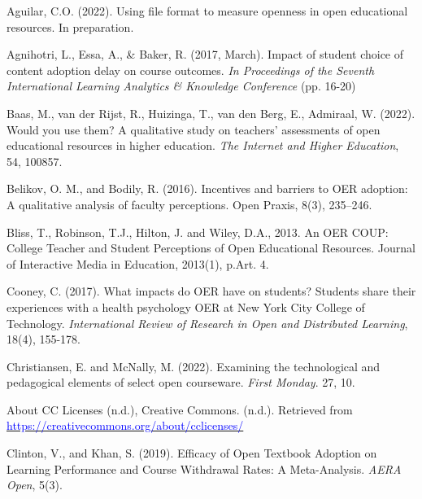 \documentclass[11pt]{article}
\newcommand{\alink}[2]{\href{#1}{\textcolor{blue}{#2}}}
\begin{document}
\begin{thebibliography}{99}

   Aguilar, C.O. (2022). Using file format to measure openness in open educational resources. In preparation.

   Agnihotri, L., Essa, A., \& Baker, R. (2017, March). Impact of student choice of content adoption delay on course outcomes. {\em In Proceedings of the Seventh International Learning Analytics \& Knowledge Conference} (pp. 16-20)

   Baas, M., van der Rijst, R., Huizinga, T., van den Berg, E., Admiraal, W. (2022). Would you use them? A qualitative study on teachers' assessments of open educational resources in higher education. {\em The Internet and Higher Education}, 54, 100857.

   Belikov, O. M., and Bodily, R. (2016). Incentives and barriers to OER adoption: A qualitative analysis of faculty perceptions. Open Praxis, 8(3), 235–246. %
  
   Bliss, T., Robinson, T.J., Hilton, J. and Wiley, D.A., 2013. An OER COUP: College Teacher and Student Perceptions of Open Educational Resources. Journal of Interactive Media in Education, 2013(1), p.Art. 4.%


   Cooney, C. (2017). What impacts do OER have on students? Students share their experiences with a health psychology OER at New York City College of Technology. {\em International Review of Research in Open and Distributed Learning}, 18(4), 155-178.

   Christiansen, E. and McNally, M. (2022). Examining the technological and pedagogical elements of select open courseware. {\em First Monday}. 27, 10.%

   About CC Licenses (n.d.), Creative Commons. (n.d.). Retrieved from \alink{https://creativecommons.org/about/cclicenses/}{https://creativecommons.org/about/cclicenses/}

   Clinton, V., and Khan, S. (2019). Efficacy of Open Textbook Adoption on Learning Performance and Course Withdrawal Rates: A Meta-Analysis. {\em AERA Open}, 5(3).%


\end{thebibliography}
\end{document}
